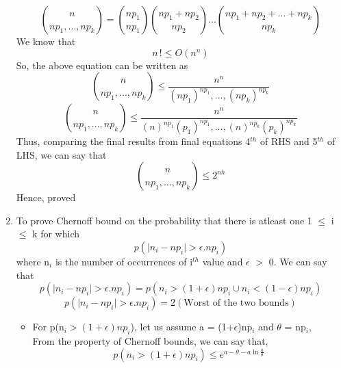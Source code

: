 \documentclass[12pt,a4paper]{article}
\begin{document}
\begin{enumerate}[label=\alph*]
    \begin{equation*}
    \binom{n}{np_{1},...,np_{k}} = \binom{np_{1}}{np_{1}}\binom{np_{1} + np_{2}}{np_{2}}...\binom{np_{1} + np_{2} +... + np_{k}}{np_{k}}
    \end{equation*}
    We know that 
    \begin{equation*}
        n\,! \leq O(n^{n})
    \end{equation*}
    So, the above equation can be written as
    \begin{equation*}
    \binom{n}{np_{1},...,np_{k}} \leqslant \frac{n^{n}}{(np_{1})^{np_{1}},...,(np_{k})^{np_{k}}} 
    \end{equation*}
    \begin{equation}
    \binom{n}{np_{1},...,np_{k}} \leqslant \frac{n^{n}}{(n)^{np_{1}}(p_{1})^{np_{1}},...,(n)^{np_{k}}(p_{k})^{np_{k}}} 
    \end{equation}
    Thus, comparing the final results from final equations 4$^{th}$ of RHS and 5$^{th}$ of LHS, we can say that 
    \begin{equation*}
    \binom{n}{np_{1},...,np_{k}} \leq 2^{nh}
    \end{equation*}
    Hence, proved
    \item 
    To prove Chernoff bound on the probability that there is atleast one 1 $\leq$ i $\leq$ k for which 
    \begin{equation*}
    p( \lvert n_{i} - np_{i} \rvert > \epsilon.np_{i})
    \end{equation*}
    where n$_{i}$ is the number of occurrences of i$^{th}$ value and $\epsilon$ $>$ 0. We can say that
    \begin{equation*}
        p( \lvert n_{i} - np_{i} \rvert > \epsilon.np_{i}) = p(n_{i} > (1+\epsilon)np_{i} \cup n_{i} < (1-\epsilon)np_{i})
    \end{equation*}
    \begin{equation*}
        p( \lvert n_{i} - np_{i} \rvert > \epsilon.np_{i}) = 2(\text{Worst of the two bounds})
    \end{equation*}
    \begin{itemize}
        \item For p(n$_{i} > (1+\epsilon) np_{i}$), let us assume a = (1+$\epsilon$)np$_{i}$ and $\theta$ = np$_{i}$,
        \\From the property of Chernoff bounds, we can say that,
        \begin{equation*}
            p(n_{i} > (1+\epsilon) np_{i}) \leqslant e^{a-\theta-a\ln{\frac{a}{\theta}}}

\end{equation*}
\end{itemize}
\end{enumerate}
\end{document}
